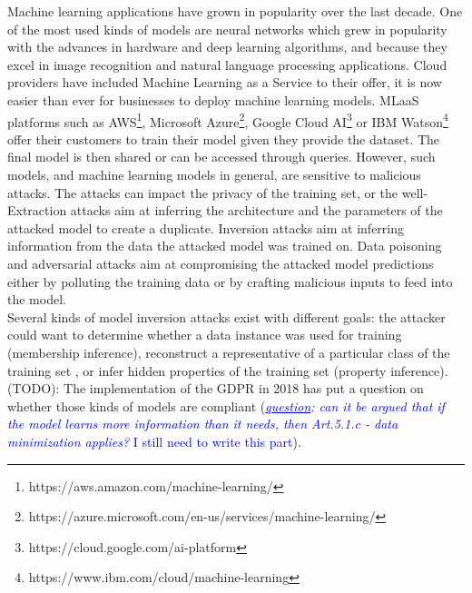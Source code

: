\documentclass[11pt]{article}
\begin{document}
    Machine learning applications have grown in popularity over the last decade. One of the most used kinds of models are neural networks which grew in popularity with the advances in hardware and deep learning algorithms, and because they excel in image recognition and natural language processing applications. Cloud providers have included Machine Learning as a Service to their offer, it is now easier than ever for businesses to deploy machine learning models. MLaaS platforms such as AWS\footnote{https://aws.amazon.com/machine-learning/}, Microsoft Azure\footnote{https://azure.microsoft.com/en-us/services/machine-learning/}, Google Cloud AI\footnote{https://cloud.google.com/ai-platform} or IBM Watson\footnote{https://www.ibm.com/cloud/machine-learning} offer their customers to train their model given they provide the dataset. The final model is then shared or can be accessed through queries. However, such models, and machine learning models in general, are sensitive to malicious attacks. The attacks can impact the privacy of the training set, or the well-Extraction attacks aim at inferring the architecture and the parameters of the attacked model to create a duplicate. Inversion attacks aim at inferring information from the data the attacked model was trained on. Data poisoning and adversarial attacks aim at compromising the attacked model predictions either by polluting the training data or by crafting malicious inputs to feed into the model.\\
    Several kinds of model inversion attacks exist with different goals: the attacker could want to determine whether a data instance was used for training (membership inference)\cite{Shokri2017, Salem2019}, reconstruct a representative of a particular class of the training set \cite{Fredrikson2015}, or infer hidden properties of the training set (property inference)\cite{Ganju2018}.\\
    
    (TODO): The implementation of the GDPR in 2018 has put a question on whether those kinds of models are compliant (\textcolor{blue}{\textit{\underline{question}: can it be argued that if the model learns more information than it needs, then Art.5.1.c - data minimization applies?} I still need to write this part}).\\
    
\end{document}
